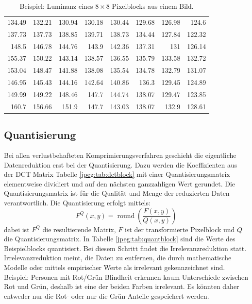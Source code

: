 \begin{table}[b]
    \centering
    \begin{tabular}{*{8}{r}}
        134.49 & 132.21 & 130.94 & 130.18 & 130.44 & 129.68 & 126.98 & 124.6\phantom{0}  \\
        137.73 & 137.73 & 138.85 & 139.71 & 138.73 & 134.44 & 127.84 & 122.32 \\
        148.5\phantom{0}  & 146.78 & 144.76 & 143.9\phantom{0}  & 142.36 & 137.31 & 131\phantom{.00}    & 126.14 \\
        155.37 & 150.22 & 143.14 & 138.57 & 136.55 & 135.79 & 133.58 & 132.72 \\
        153.04 & 148.47 & 141.88 & 138.08 & 135.54 & 134.78 & 132.79 & 131.07 \\
        146.95 & 145.43 & 144.16 & 142.64 & 140.86 & 136.3\phantom{0}  & 129.45 & 124.89 \\
        149.99 & 149.22 & 148.46 & 147.7\phantom{0}  & 144.74 & 138.07 & 129.47 & 123.85 \\
        160.7\phantom{0}  & 156.66 & 151.9\phantom{0}  & 147.7\phantom{0}  & 143.03 & 138.07 & 132.9\phantom{0}  & 128.61
    \end{tabular}
    \caption{Beispiel: Luminanz eines \(8\times8\) Pixelblocks aus einem Bild.
        \label{jpeg:tab:orgblock}}
\end{table}

\subsection{Quantisierung
\label{jpeg:subsection:quantisierung}}
Bei allen verlustbehafteten Komprimierungsverfahren geschieht die eigentliche Datenreduktion erst bei der Quantisierung.
Dazu werden die Koeffizienten aus der DCT Matrix  Tabelle \ref{jpeg:tab:dctblock} mit einer Quantisierungsmatrix elementweise dividiert und auf den nächsten ganzzahligen Wert gerundet.
Die Quantisierungsmatrix ist für die Qualität und Menge der reduzierten Daten verantwortlich.
Die Quantisierung erfolgt mittels: 
\begin{equation}
    F^Q(x,y)
    =
    \operatorname{round} \left(
    \frac{F(x,y)}{Q(x,y)}
    \right)
\end{equation}
dabei ist \(F^Q\) die resultierende Matrix, \(F\) ist der transformierte Pixelblock und \(Q\) die Quantisierungsmatrix.
In Tabelle \ref{jpeg:tab:quantblock} sind die Werte des Beispielblocks quantisiert.
Bei diesem Schritt findet die Irrelevanzreduktion statt.
Irrelevanzreduktion meint, die Daten zu entfernen, die durch mathematische Modelle oder mittels empirischer Werte als irrelevant gekennzeichnet sind.
Beispiel: Personen mit Rot/Grün Blindheit erkennen kaum Unterschiede zwischen Rot und Grün, deshalb ist eine der beiden Farben irrelevant.
Es könnten daher entweder nur die Rot- oder nur die Grün-Anteile gespeichert werden.

